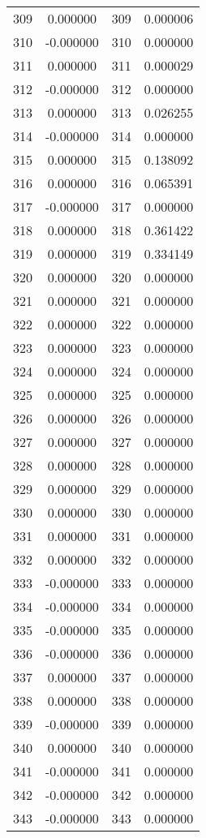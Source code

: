 \documentclass[12pt]{article}
\begin{document}
\begin{longtable}{@{}cccc@{}}
309 & 0.000000 & 309 & 0.000006 \\
310 & -0.000000 & 310 & 0.000000 \\
311 & 0.000000 & 311 & 0.000029 \\
312 & -0.000000 & 312 & 0.000000 \\
313 & 0.000000 & 313 & 0.026255 \\
314 & -0.000000 & 314 & 0.000000 \\
315 & 0.000000 & 315 & 0.138092 \\
316 & 0.000000 & 316 & 0.065391 \\
317 & -0.000000 & 317 & 0.000000 \\
318 & 0.000000 & 318 & 0.361422 \\
319 & 0.000000 & 319 & 0.334149 \\
320 & 0.000000 & 320 & 0.000000 \\
321 & 0.000000 & 321 & 0.000000 \\
322 & 0.000000 & 322 & 0.000000 \\
323 & 0.000000 & 323 & 0.000000 \\
324 & 0.000000 & 324 & 0.000000 \\
325 & 0.000000 & 325 & 0.000000 \\
326 & 0.000000 & 326 & 0.000000 \\
327 & 0.000000 & 327 & 0.000000 \\
328 & 0.000000 & 328 & 0.000000 \\
329 & 0.000000 & 329 & 0.000000 \\
330 & 0.000000 & 330 & 0.000000 \\
331 & 0.000000 & 331 & 0.000000 \\
332 & 0.000000 & 332 & 0.000000 \\
333 & -0.000000 & 333 & 0.000000 \\
334 & -0.000000 & 334 & 0.000000 \\
335 & -0.000000 & 335 & 0.000000 \\
336 & -0.000000 & 336 & 0.000000 \\
337 & 0.000000 & 337 & 0.000000 \\
338 & 0.000000 & 338 & 0.000000 \\
339 & -0.000000 & 339 & 0.000000 \\
340 & 0.000000 & 340 & 0.000000 \\
341 & -0.000000 & 341 & 0.000000 \\
342 & -0.000000 & 342 & 0.000000 \\
343 & -0.000000 & 343 & 0.000000 \\

\end{longtable}
\end{document}
